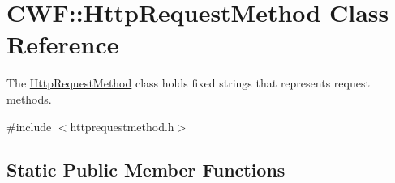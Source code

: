 \hypertarget{class_c_w_f_1_1_http_request_method}{\section{C\+W\+F\+:\+:Http\+Request\+Method Class Reference}
\label{class_c_w_f_1_1_http_request_method}
}


The \hyperlink{class_c_w_f_1_1_http_request_method}{Http\+Request\+Method} class holds fixed strings that represents request methods.  




{\ttfamily \#include $<$httprequestmethod.\+h$>$}

\subsection*{Static Public Member Functions}
